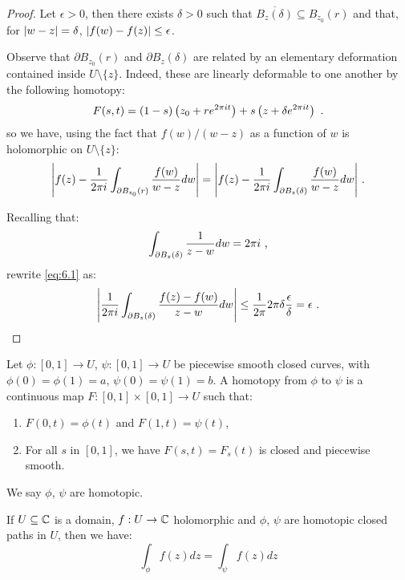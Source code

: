 \begin{proof}
  Let $\epsilon > 0$, then there exists $\delta > 0$ such that $\overline{B_z(\delta)} \subseteq B_{z_0}(r)$ and that, for $\abs{w - z} = \delta$, $\abs{f(w) - f(z)} \leq \epsilon$.

Observe that $\partial B_{z_0}(r)$ and $\partial B_z(\delta)$ are related by an elementary deformation contained inside $U \setminus \{z\}$.
Indeed, these are linearly deformable to one another by the following homotopy:
\[
F(s, t) = (1 - s)\left(z_0 + re^{2\pi{}it}\right) + s\left(z + \delta e^{2\pi i t}\right) \mpunct{.}
\]
so we have, using the fact that $f(w)/(w - z)$ as a function of $w$ is holomorphic on $U \setminus \{z\}$:
\begin{equation}
  \label{eq:6.1}
  \abs*{f(z) - \frac{1}{2\pi i}\int_{\partial B_{z_0}(r)} \frac{f(w)}{w - z} dw} = \abs*{f(z) - \frac{1}{2 \pi i} \int_{\partial B_z(\delta)} \frac{f(w)}{w - z}dw} \mpunct{.}
\end{equation}

Recalling that:
\[
\int_{\partial B_z(\delta)} \frac{1}{z - w} dw = 2 \pi i \mpunct{,}
\]
rewrite \eqref{eq:6.1} as:
\[
\abs*{\frac{1}{2 \pi i} \int_{\partial B_z(\delta)} \frac{f(z) - f(w)}{z - w} dw} \leq \frac{1}{2 \pi} 2 \pi \delta \frac{\epsilon}{\delta} = \epsilon \mpunct{.}
\]
\end{proof}

\begin{definition}
  Let $\phi : [0, 1] \rightarrow U$, $\psi : [0, 1] \rightarrow U$ be piecewise smooth closed curves, with $\phi(0) = \phi(1) = a$, $\psi(0) = \psi(1) = b$.
A homotopy from $\phi$ to $\psi$ is a continuous map $F : [0, 1] \times [0, 1] \rightarrow U$ such that:
\begin{enumerate}
\item $F(0, t) = \phi(t)$ and $F(1, t) = \psi(t)$,
\item For all $s$ in $[0, 1]$, we have $F(s, t) = F_s(t)$ is closed and piecewise smooth.
\end{enumerate}
We say $\phi$, $\psi$ are homotopic.
\end{definition}

\begin{proposition}
  If $U \subseteq \CC$ is a domain, $f : U \rightarrow \CC$ holomorphic and $\phi$, $\psi$ are homotopic closed paths in $U$, then we have:
\[
\int_\phi f(z) dz = \int_\psi f(z) dz
\]
\end{proposition}

